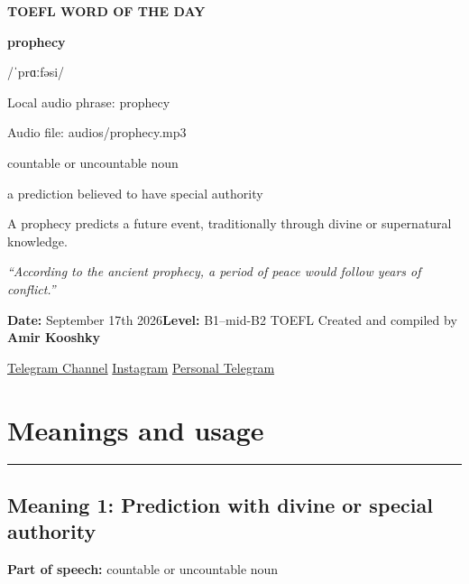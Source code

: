 \documentclass[11pt]{article}
\newcommand{\sectionrule}{\par\vspace{-0.5em}\noindent\textcolor{Accent}{\rule{\linewidth}{0.6pt}}\par}
\begin{document}
\begin{center}
{\sffamily\bfseries\color{Accent} TOEFL WORD OF THE DAY\par}
\vspace{8mm}
{\fontsize{42}{48}\selectfont\bfseries prophecy\par}
\vspace{2mm}
{\Large\sffamily\color{Accent} /ˈprɑːfəsi/\par}
\vspace{2mm}
{\small\sffamily Local audio phrase: prophecy\par}
{\small\sffamily Audio file: audios/prophecy.mp3\par}
\vspace{2mm}
{\large\sffamily\color{Muted} countable or uncountable noun\par}
\vspace{5mm}
{\sffamily a prediction believed to have special authority\par}
\vspace{6mm}
{\large A prophecy predicts a future event, traditionally through divine or supernatural knowledge.\par}
\vspace{6mm}
\begin{minipage}{0.84\textwidth}
\itshape “According to the ancient prophecy, a period of peace would follow years of conflict.”
\end{minipage}\par
\vspace{10mm}
\textbf{Date:} September 17th 2026\quad\textbullet\quad \textbf{Level:} B1--mid-B2 TOEFL
\vfill
Created and compiled by \textbf{Amir Kooshky}\par
\vspace{2mm}
\href{https://t.me/KooshkyTOEFL}{Telegram Channel}\quad\textbullet\quad
\href{https://www.instagram.com/kooshkytoefl}{Instagram}\quad\textbullet\quad
\href{https://t.me/KooshkyTOEFL\_pv}{Personal Telegram}
\end{center}
\newpage
\tableofcontents
\newpage

\section{Meanings and usage}
\sectionrule
\subsection{Meaning 1: Prediction with divine or special authority}
\textbf{Part of speech:} countable or uncountable noun
\end{document}
